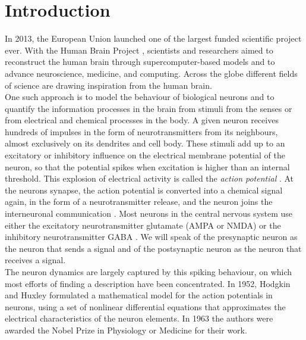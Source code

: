 \newpage
\section{Introduction} \label{sec:Introduction}
In 2013, the European Union launched one of the largest funded scientific project ever. With the Human Brain Project \cite{humanbrainproject}, scientists and researchers aimed to reconstruct the human brain through supercomputer-based models and to advance neuroscience, medicine, and computing. Across the globe different fields of science are drawing inspiration from the human brain. \\

One such approach is to model the behaviour of biological neurons and to quantify the information processes in the brain from stimuli from the senses or from electrical and chemical processes in the body. A given neuron receives hundreds of impulses in the form of neurotransmitters from its neighbours, almost exclusively on its dendrites and cell body. These stimuli add up to an excitatory or inhibitory influence on the electrical membrane potential of the neuron, so that the potential spikes when excitation is higher than an internal threshold. This explosion of electrical activity is called the \textsl{action potential} \cite{IntroductionModelingDynamics}. At the neurons synapse, the action potential is converted into a chemical signal again, in the form of a neurotransmitter release, and the neuron joins the interneuronal communication \cite{ActionPotentialsAndSynapses}. Most neurons in the central nervous system use either the excitatory neurotransmitter glutamate (AMPA or NMDA) or the inhibitory neurotransmitter GABA \cite{MathFoundationNeuroscience, Zhang2012}. We will speak of the presynaptic neuron as the neuron that sends a signal and of the postsynaptic neuron as the neuron that receives a signal. \\



The neuron dynamics are largely captured by this spiking behaviour, on which most efforts of finding a description have been concentrated.
In 1952, Hodgkin and Huxley formulated a mathematical model for the action potentials in neurons, using a set of nonlinear differential equations that approximates the electrical characteristics of the neuron elements. In 1963 the authors were awarded the Nobel Prize in Physiology or Medicine \cite{nobel1963} for their work.\\

